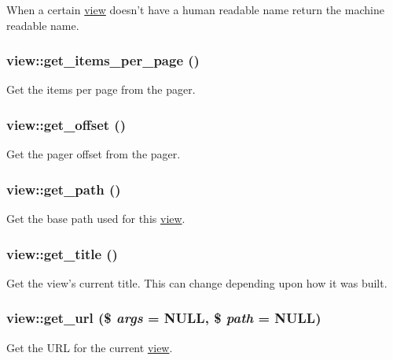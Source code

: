 When a certain \hyperlink{classview}{view} doesn't have a human readable name return the machine readable name. \hypertarget{classview_a3e74e79be315a0db27ed07782da5859d}{
\subsubsection[{get\_\-items\_\-per\_\-page}]{\setlength{\rightskip}{0pt plus 5cm}view::get\_\-items\_\-per\_\-page ()}}
\label{classview_a3e74e79be315a0db27ed07782da5859d}
Get the items per page from the pager. \hypertarget{classview_acf28a271baf8de169d84071d7ab5e53d}{
\subsubsection[{get\_\-offset}]{\setlength{\rightskip}{0pt plus 5cm}view::get\_\-offset ()}}
\label{classview_acf28a271baf8de169d84071d7ab5e53d}
Get the pager offset from the pager. \hypertarget{classview_a2a43eaa103f3bb4c6677afbf8a94a549}{
\subsubsection[{get\_\-path}]{\setlength{\rightskip}{0pt plus 5cm}view::get\_\-path ()}}
\label{classview_a2a43eaa103f3bb4c6677afbf8a94a549}
Get the base path used for this \hyperlink{classview}{view}. \hypertarget{classview_ad2fe858c2ebd577922413355cd42eb10}{
\subsubsection[{get\_\-title}]{\setlength{\rightskip}{0pt plus 5cm}view::get\_\-title ()}}
\label{classview_ad2fe858c2ebd577922413355cd42eb10}
Get the view's current title. This can change depending upon how it was built. \hypertarget{classview_a3ed974c9fffd899f1ad371c47e8781e3}{
\subsubsection[{get\_\-url}]{\setlength{\rightskip}{0pt plus 5cm}view::get\_\-url (\$ {\em args} = {\ttfamily NULL}, \/  \$ {\em path} = {\ttfamily NULL})}}
\label{classview_a3ed974c9fffd899f1ad371c47e8781e3}
Get the URL for the current \hyperlink{classview}{view}.

